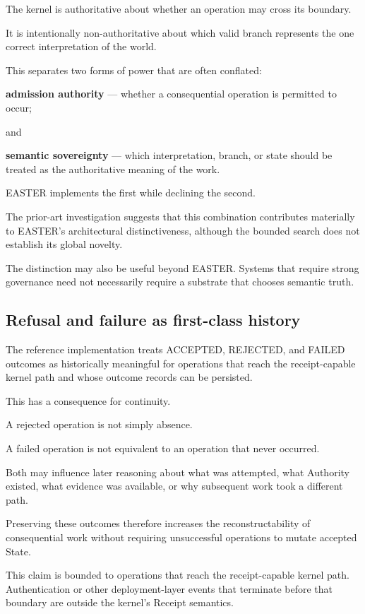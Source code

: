 \documentclass[11pt]{article}
\begin{document}
The kernel is authoritative about whether an operation may cross its boundary.

It is intentionally non-authoritative about which valid branch represents the one correct interpretation of the world.

This separates two forms of power that are often conflated:

\textbf{admission authority} --- whether a consequential operation is permitted to occur;

and

\textbf{semantic sovereignty} --- which interpretation, branch, or state should be treated as the authoritative meaning of the work.

EASTER implements the first while declining the second.

The prior-art investigation suggests that this combination contributes materially to EASTER's architectural distinctiveness, although the bounded search does not establish its global novelty.

The distinction may also be useful beyond EASTER. Systems that require strong governance need not necessarily require a substrate that chooses semantic truth.

\subsection{Refusal and failure as first-class history}

The reference implementation treats ACCEPTED, REJECTED, and FAILED outcomes as historically meaningful for operations that reach the receipt-capable kernel path and whose outcome records can be persisted.

This has a consequence for continuity.

A rejected operation is not simply absence.

A failed operation is not equivalent to an operation that never occurred.

Both may influence later reasoning about what was attempted, what Authority existed, what evidence was available, or why subsequent work took a different path.

Preserving these outcomes therefore increases the reconstructability of consequential work without requiring unsuccessful operations to mutate accepted State.

This claim is bounded to operations that reach the receipt-capable kernel path. Authentication or other deployment-layer events that terminate before that boundary are outside the kernel's Receipt semantics.
\end{document}
